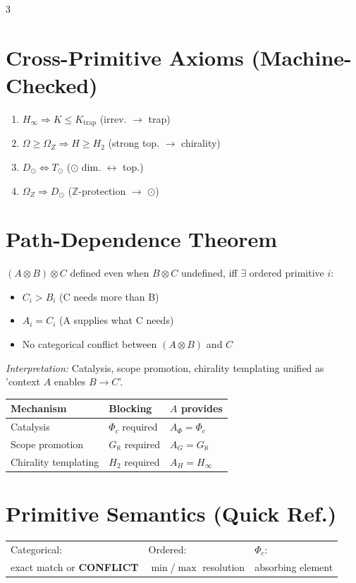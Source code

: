 \documentclass[8pt,a4paper,landscape]{article}
\newcommand{\cat}[1]{\textcolor{catblue}{#1}}
\newcommand{\ord}[1]{\textcolor{ordgreen}{#1}}
\newcommand{\spec}[1]{\textcolor{specpurple}{#1}}
\newcommand{\conf}{\textcolor{confred}{\textbf{CONFLICT}}}
\begin{document}
\begin{multicols}{3}
\section*{Cross-Primitive Axioms (Machine-Checked)}
\footnotesize
\begin{enumerate}[leftmargin=*,label=\textbf{A\arabic*}.]
\item $H_\infty \Rightarrow K\le K_{\text{trap}}$ \hfill(irrev. $\to$ trap)
\item $\Omega\ge\Omega_Z \Rightarrow H\ge H_2$ \hfill(strong top. $\to$ chirality)
\item $D_\odot \Leftrightarrow T_\odot$ \hfill($\odot$ dim. $\leftrightarrow$ top.)
\item $\Omega_Z \Rightarrow D_\odot$ \hfill($\mathbb{Z}$-protection $\to$ $\odot$)
\end{enumerate}

\section*{Path-Dependence Theorem}
\footnotesize
$(A\otimes B)\otimes C$ defined even when $B\otimes C$ undefined, iff $\exists$ ordered primitive $i$:
\begin{itemize}[leftmargin=*,nosep,topsep=4pt,itemsep=2pt]
\item $C_i > B_i$ (C needs more than B)
\item $A_i = C_i$ (A supplies what C needs)
\item No categorical conflict between $(A\otimes B)$ and $C$
\end{itemize}
\textit{Interpretation:} Catalysis, scope promotion, chirality templating unified as 'context $A$ enables $B\to C$'.

\begin{center}
\footnotesize
\renewcommand{\arraystretch}{1.1}
\begin{tabular}{|l|l|l|}
\hline
\textbf{Mechanism} & \textbf{Blocking} & \textbf{$A$ provides} \\
\hline
Catalysis & $\Phi_c$ required & $A_\Phi = \Phi_c$ \\
Scope promotion & $G_\aleph$ required & $A_G = G_\aleph$ \\
Chirality templating & $H_2$ required & $A_H = H_\infty$ \\
\hline
\end{tabular}
\end{center}

\section*{Primitive Semantics (Quick Ref.)}
\footnotesize
\begin{tabular}{@{}p{2.6cm}p{2.6cm}p{2.6cm}@{}}
\cat{Categorical:} & \ord{Ordered:} & \spec{$\Phi_c$:} \\
exact match or \conf & $\min$/$\max$ resolution & absorbing element \\
\end{tabular}


\end{multicols}
\end{document}
